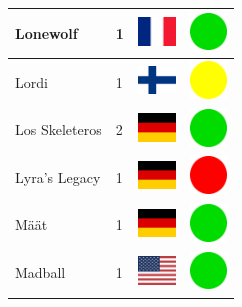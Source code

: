 \documentclass[12pt, a4paper, twoside]{report}
\begin{document}
\begin{center}
\begin{longtable}{|p{5cm}|p{2cm}|p{2cm}|p{2cm}|}
			Lonewolf & 1 & \includegraphics[width=1cm]{4x3/fr} & \includegraphics[width=1cm]{likes/y} \\ \hline
			Lordi & 1 & \includegraphics[width=1cm]{4x3/fi} & \includegraphics[width=1cm]{likes/m} \\ \hline
			Los Skeleteros & 2 & \includegraphics[width=1cm]{4x3/de} & \includegraphics[width=1cm]{likes/y} \\ \hline
			Lyra's Legacy & 1 & \includegraphics[width=1cm]{4x3/de} & \includegraphics[width=1cm]{likes/n} \\ \hline
			Määt & 1 & \includegraphics[width=1cm]{4x3/de} & \includegraphics[width=1cm]{likes/y} \\ \hline
			Madball & 1 & \includegraphics[width=1cm]{4x3/us} & \includegraphics[width=1cm]{likes/y} \\ \hline

\end{longtable}
\end{center}
\end{document}
